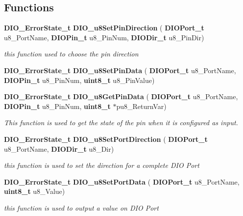 \subsection*{Functions}
\begin{DoxyCompactItemize}
\item 
\textbf{ D\+I\+O\+\_\+\+Error\+State\+\_\+t} \textbf{ D\+I\+O\+\_\+u8\+Set\+Pin\+Direction} (\textbf{ D\+I\+O\+Port\+\_\+t} u8\+\_\+\+Port\+Name, \textbf{ D\+I\+O\+Pin\+\_\+t} u8\+\_\+\+Pin\+Num, \textbf{ D\+I\+O\+Dir\+\_\+t} u8\+\_\+\+Pin\+Dir)
\begin{DoxyCompactList}\small\item\em this function used to choose the pin direction \end{DoxyCompactList}\item 
\textbf{ D\+I\+O\+\_\+\+Error\+State\+\_\+t} \textbf{ D\+I\+O\+\_\+u8\+Set\+Pin\+Data} (\textbf{ D\+I\+O\+Port\+\_\+t} u8\+\_\+\+Port\+Name, \textbf{ D\+I\+O\+Pin\+\_\+t} u8\+\_\+\+Pin\+Num, \textbf{ uint8\+\_\+t} u8\+\_\+\+Pin\+Value)
\item 
\textbf{ D\+I\+O\+\_\+\+Error\+State\+\_\+t} \textbf{ D\+I\+O\+\_\+u8\+Get\+Pin\+Data} (\textbf{ D\+I\+O\+Port\+\_\+t} u8\+\_\+\+Port\+Name, \textbf{ D\+I\+O\+Pin\+\_\+t} u8\+\_\+\+Pin\+Num, \textbf{ uint8\+\_\+t} $\ast$pu8\+\_\+\+Return\+Var)
\begin{DoxyCompactList}\small\item\em This function is used to get the state of the pin when it is configured as input. \end{DoxyCompactList}\item 
\textbf{ D\+I\+O\+\_\+\+Error\+State\+\_\+t} \textbf{ D\+I\+O\+\_\+u8\+Set\+Port\+Direction} (\textbf{ D\+I\+O\+Port\+\_\+t} u8\+\_\+\+Port\+Name, \textbf{ D\+I\+O\+Dir\+\_\+t} u8\+\_\+\+Dir)
\begin{DoxyCompactList}\small\item\em this function is used to set the direction for a complete D\+IO Port \end{DoxyCompactList}\item 
\textbf{ D\+I\+O\+\_\+\+Error\+State\+\_\+t} \textbf{ D\+I\+O\+\_\+u8\+Set\+Port\+Data} (\textbf{ D\+I\+O\+Port\+\_\+t} u8\+\_\+\+Port\+Name, \textbf{ uint8\+\_\+t} u8\+\_\+\+Value)
\begin{DoxyCompactList}\small\item\em this function is used to output a value on D\+IO Port \end{DoxyCompactList}\item 

\end{DoxyCompactItemize}
